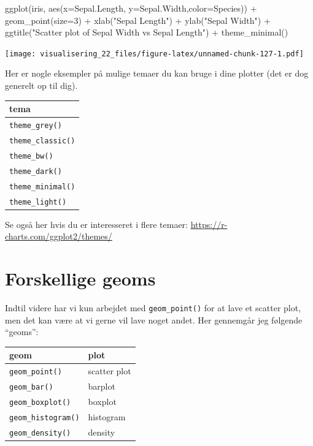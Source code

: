 \documentclass[
]{book}
\newenvironment{Shaded}{\begin{snugshade}}{\end{snugshade}}
\newcommand{\AttributeTok}[1]{\textcolor[rgb]{0.77,0.63,0.00}{#1}}
\newcommand{\DecValTok}[1]{\textcolor[rgb]{0.00,0.00,0.81}{#1}}
\newcommand{\FunctionTok}[1]{\textcolor[rgb]{0.00,0.00,0.00}{#1}}
\newcommand{\NormalTok}[1]{#1}
\newcommand{\SpecialCharTok}[1]{\textcolor[rgb]{0.00,0.00,0.00}{#1}}
\newcommand{\StringTok}[1]{\textcolor[rgb]{0.31,0.60,0.02}{#1}}
\begin{document}
\begin{Shaded}
\begin{Highlighting}[]
\FunctionTok{ggplot}\NormalTok{(iris, }\FunctionTok{aes}\NormalTok{(}\AttributeTok{x=}\NormalTok{Sepal.Length, }\AttributeTok{y=}\NormalTok{Sepal.Width,}\AttributeTok{color=}\NormalTok{Species)) }\SpecialCharTok{+}
  \FunctionTok{geom\_point}\NormalTok{(}\AttributeTok{size=}\DecValTok{3}\NormalTok{) }\SpecialCharTok{+}
  \FunctionTok{xlab}\NormalTok{(}\StringTok{"Sepal Length"}\NormalTok{) }\SpecialCharTok{+}
  \FunctionTok{ylab}\NormalTok{(}\StringTok{"Sepal Width"}\NormalTok{) }\SpecialCharTok{+}
  \FunctionTok{ggtitle}\NormalTok{(}\StringTok{"Scatter plot of Sepal Width vs Sepal Length"}\NormalTok{) }\SpecialCharTok{+}
  \FunctionTok{theme\_minimal}\NormalTok{()}
\end{Highlighting}
\end{Shaded}

\texttt{[image: visualisering\_22\_files/figure-latex/unnamed-chunk-127-1.pdf]}

Her er nogle eksempler på mulige temaer du kan bruge i dine plotter (det er dog generelt op til dig).

\begin{longtable}[]{@{}l@{}}
\toprule
tema \\
\midrule
\endhead
\texttt{theme\_grey()} \\
\texttt{theme\_classic()} \\
\texttt{theme\_bw()} \\
\texttt{theme\_dark()} \\
\texttt{theme\_minimal()} \\
\texttt{theme\_light()} \\
\bottomrule
\end{longtable}

Se også her hvis du er interesseret i flere temaer: \url{https://r-charts.com/ggplot2/themes/}

\hypertarget{forskellige-geoms}{%
\section{Forskellige geoms}\label{forskellige-geoms}}

Indtil videre har vi kun arbejdet med \texttt{geom\_point()} for at lave et scatter plot, men det kan være at vi gerne vil lave noget andet. Her gennemgår jeg følgende ``geoms'':

\begin{longtable}[]{@{}ll@{}}
\toprule
geom & plot \\
\midrule
\endhead
\texttt{geom\_point()} & scatter plot \\
\texttt{geom\_bar()} & barplot \\
\texttt{geom\_boxplot()} & boxplot \\
\texttt{geom\_histogram()} & histogram \\
\texttt{geom\_density()} & density \\
\bottomrule
\end{longtable}
\end{document}
